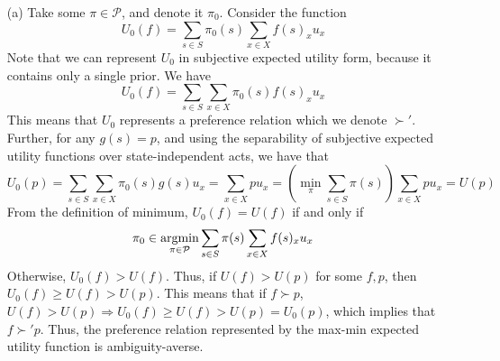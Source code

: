 \documentclass[12pt]{article}
\begin{document}
\begin{itemize}
    \item[(a)] Take some $\pi \in \mathcal{P}$, and denote it $\pi_0$. Consider the function 
    \[
    U_0(f) = \sum_{s \in S} \pi_0(s) \sum_{x \in X} f(s)_x u_x
    \]
    Note that we can represent $U_0$ in subjective expected utility form, because it contains only a single prior. We have
    \[
    U_0(f) = \sum_{s\in S} \sum_{x \in X} \pi_0(s) f(s)_x u_x
    \]
    This means that $U_0$ represents a preference relation which we denote $\succ'$. Further, for any $g(s) = p$, and using the separability of subjective expected utility functions over state-independent acts, we have that
    \[
    U_0(p) = \sum_{s\in S} \sum_{x \in X} \pi_0(s) g(s) u_x = \sum_{x \in X} pu_x = \left(\min_\pi \sum_{s\in S} \pi(s) \right) \sum_{x \in X} pu_x = U(p)
    \]
    From the definition of minimum, $U_0(f) = U(f)$ if and only if
    \[
    \pi_0 \in \mathop{\rm argmin}_{\pi \in \mathcal{P}}\sum_{s \in S} \pi(s) \sum_{x \in X} f(s)_x u_x
    \]
    Otherwise, $U_0(f) > U(f)$. Thus, if $U(f) > U(p)$ for some $f,p$, then $U_0(f) \ge U(f) > U(p)$. This means that if $f \succ p$, $U(f) > U(p) \Rightarrow U_0(f) \ge U(f) > U(p) = U_0(p)$, which implies that $f \succ' p$. Thus, the preference relation represented by the max-min expected utility function is ambiguity-averse.



\end{itemize}
\end{document}
